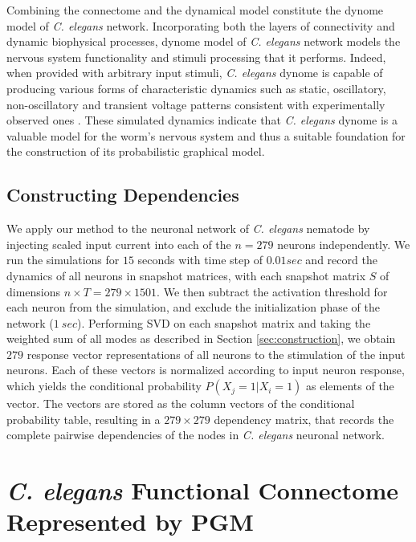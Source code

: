 \documentclass[letterpaper,11pt]{article}
\newcommand\tab[1][6mm]{\hspace*{#1}}
\begin{document}
Combining the connectome and the dynamical model constitute the dynome model of \textit{C. elegans} network. Incorporating both the layers of connectivity and dynamic biophysical processes, dynome model of \textit{C. elegans} network models the nervous system functionality and stimuli processing that it performs. Indeed, when provided with arbitrary input stimuli, \textit{C. elegans} dynome is capable of producing various forms of characteristic dynamics such as static, oscillatory, non-oscillatory and transient voltage patterns consistent with experimentally observed ones \cite{dynome}. These simulated dynamics indicate that \textit{C. elegans} dynome is a valuable model for the worm's nervous system and thus a suitable foundation for the construction of its probabilistic graphical model.

\subsection{Constructing Dependencies}
\tab We apply our method to the neuronal network of \textit{C. elegans} nematode by injecting scaled input current into each of the $n=279$ neurons independently. We run the simulations for $15$ seconds with time step of $0.01 sec$ and record the dynamics of all neurons in snapshot matrices, with each snapshot matrix $S$ of dimensions $n \times T = 279\times 1501$. We then subtract the activation threshold for each neuron from the simulation, and exclude the initialization phase of the network ($1 ~sec$). Performing SVD on each snapshot matrix and taking the weighted sum of all modes as described in Section \ref{sec:construction}, we obtain $279$ response vector representations of all neurons to the stimulation of the input neurons. Each of these vectors is normalized according to input neuron response, which yields the conditional probability $P(X_j=1|X_i=1)$ as elements of the vector. The vectors are stored as the column vectors of the conditional probability table, resulting in a $279\times 279$ dependency matrix, that records the complete pairwise dependencies of the nodes in \textit{C. elegans} neuronal network.

\section{\textit{C. elegans} Functional Connectome Represented by PGM}
\end{document}
